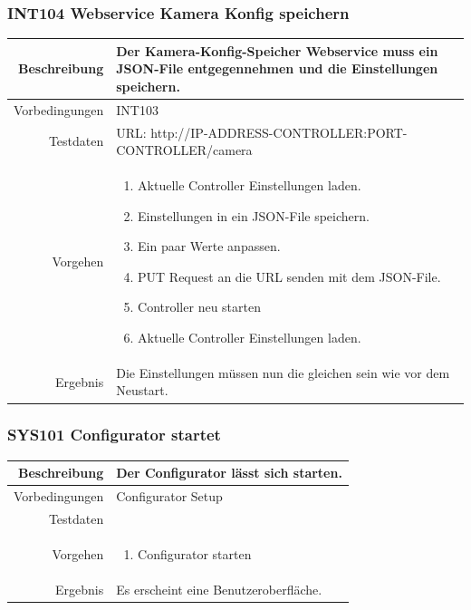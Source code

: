 \subsubsection{INT104 Webservice Kamera Konfig speichern}
\begin{table}[h!]
	\renewcommand{\arraystretch}{1.5}
	\begin{tabular}{|r|p{14cm}|}
		\hline Beschreibung & Der Kamera-Konfig-Speicher Webservice muss ein JSON-File entgegennehmen und die Einstellungen speichern. \\ 
		\hline Vorbedingungen & INT103 \\ 
		\hline Testdaten & URL: http://IP-ADDRESS-CONTROLLER:PORT-CONTROLLER/camera \\ 
		\hline Vorgehen & 
		\begin{enumerate}
			\item Aktuelle Controller Einstellungen laden.
			\item Einstellungen in ein JSON-File speichern.
			\item Ein paar Werte anpassen.
			\item PUT Request an die URL senden mit dem JSON-File.
			\item Controller neu starten
			\item Aktuelle Controller Einstellungen laden.
		\end{enumerate} \\ 
		\hline Ergebnis & Die Einstellungen müssen nun die gleichen sein wie vor dem Neustart. \\ 
		\hline 
	\end{tabular}
\end{table}

\subsubsection{SYS101 Configurator startet}
\begin{table}[h!]
	\renewcommand{\arraystretch}{1.5}
	\begin{tabular}{|r|p{14cm}|}
		\hline Beschreibung & Der Configurator lässt sich starten. \\ 
		\hline Vorbedingungen & Configurator Setup \\ 
		\hline Testdaten &  \\ 
		\hline Vorgehen & 
		\begin{enumerate}
			\item Configurator starten
		\end{enumerate} \\ 
		\hline Ergebnis & Es erscheint eine Benutzeroberfläche. \\ 
		\hline 
	\end{tabular}
\end{table}

